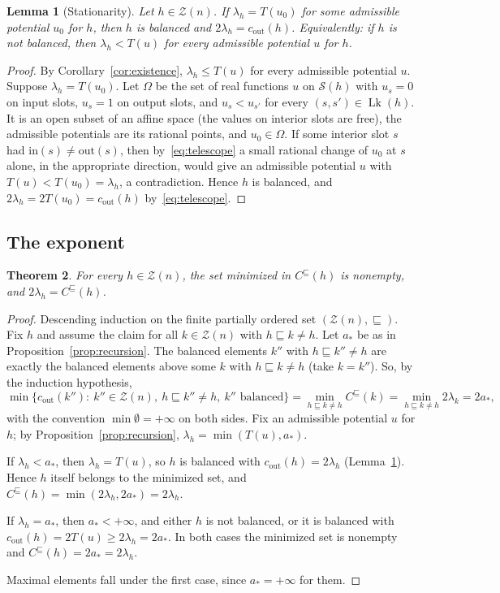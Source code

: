 \documentclass[11pt,a4paper]{article}
\newtheorem{theorem}{Theorem}[section]
\newtheorem{lemma}[theorem]{Lemma}
\theoremstyle{definition}
\theoremstyle{remark}
\numberwithin{equation}{section}
\newcommand{\cout}{c_{\mathrm{out}}}
\newcommand{\Zb}{\mathcal Z}
\newcommand{\Sl}{\mathcal S}
\newcommand{\Lk}{\operatorname{Lk}}
\begin{document}
\begin{lemma}[Stationarity]\label{lem:stationarity}
Let $h\in\Zb(n)$. If $\lambda_h=T(u_0)$ for some admissible potential $u_0$ for $h$, then $h$ is balanced and $2\lambda_h=\cout(h)$. Equivalently: if $h$ is not balanced, then $\lambda_h<T(u)$ for every admissible potential $u$ for $h$.
\end{lemma}
\begin{proof}
By Corollary~\ref{cor:existence}, $\lambda_h\le T(u)$ for every admissible potential $u$. Suppose $\lambda_h=T(u_0)$. Let $\Omega$ be the set of real functions $u$ on $\Sl(h)$ with $u_s=0$ on input slots, $u_s=1$ on output slots, and $u_s<u_{s'}$ for every $(s,s')\in\Lk(h)$. It is an open subset of an affine space (the values on interior slots are free), the admissible potentials are its rational points, and $u_0\in\Omega$. If some interior slot $s$ had $\mathrm{in}(s)\neq\mathrm{out}(s)$, then by~\eqref{eq:telescope} a small rational change of $u_0$ at $s$ alone, in the appropriate direction, would give an admissible potential $u$ with $T(u)<T(u_0)=\lambda_h$, a contradiction. Hence $h$ is balanced, and $2\lambda_h=2T(u_0)=\cout(h)$ by~\eqref{eq:telescope}.
\end{proof}

\subsection{The exponent}
\begin{theorem}\label{thm:coefficient}
For every $h\in\Zb(n)$, the set minimized in $C^\sqsubseteq(h)$ is nonempty, and $2\lambda_h=C^\sqsubseteq(h)$.
\end{theorem}
\begin{proof}
Descending induction on the finite partially ordered set $(\Zb(n),\sqsubseteq)$. Fix $h$ and assume the claim for all $k\in\Zb(n)$ with $h\sqsubseteq k\neq h$. Let $a_*$ be as in Proposition~\ref{prop:recursion}. The balanced elements $k''$ with $h\sqsubseteq k''\neq h$ are exactly the balanced elements above some $k$ with $h\sqsubseteq k\neq h$ (take $k=k''$). So, by the induction hypothesis,
\[
\min\{\cout(k''):\ k''\in\Zb(n),\ h\sqsubseteq k''\neq h,\ k''\text{ balanced}\}=\min_{h\sqsubseteq k\neq h}C^\sqsubseteq(k)=\min_{h\sqsubseteq k\neq h}2\lambda_k=2a_*,
\]
with the convention $\min\emptyset=+\infty$ on both sides. Fix an admissible potential $u$ for $h$; by Proposition~\ref{prop:recursion}, $\lambda_h=\min(T(u),a_*)$.

If $\lambda_h<a_*$, then $\lambda_h=T(u)$, so $h$ is balanced with $\cout(h)=2\lambda_h$ (Lemma~\ref{lem:stationarity}). Hence $h$ itself belongs to the minimized set, and $C^\sqsubseteq(h)=\min(2\lambda_h,2a_*)=2\lambda_h$.

If $\lambda_h=a_*$, then $a_*<+\infty$, and either $h$ is not balanced, or it is balanced with $\cout(h)=2T(u)\ge2\lambda_h=2a_*$. In both cases the minimized set is nonempty and $C^\sqsubseteq(h)=2a_*=2\lambda_h$.

Maximal elements fall under the first case, since $a_*=+\infty$ for them.
\end{proof}
\end{document}
